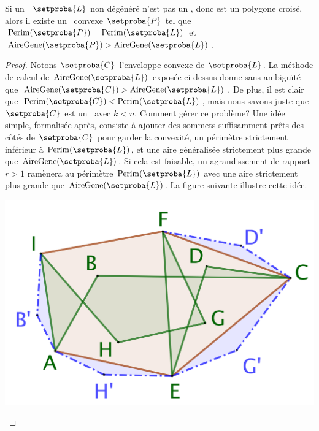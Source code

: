 

\begin{fact} \label{no-cross-max}
    Si un \ncycle\ $\setproba{L}$ non dégénéré n'est pas un \ngone, donc est un polygone croisé, alors il existe un \ngone\ convexe $\setproba{P}$ tel que
	$\perim{\setproba{P}} = \perim{\setproba{L}}$
	et
	$\garea{\setproba{P}} > \garea{\setproba{L}}$.
\end{fact}


\begin{proof}
	Notons $\setproba{C}$ l'enveloppe convexe de $\setproba{L}$. La méthode de calcul de $\garea{\setproba{L}}$ exposée ci-dessus donne sans ambiguïté que $\garea{\setproba{C}} > \garea{\setproba{L}}$. De plus, il est clair que $\perim{\setproba{C}} < \perim{\setproba{L}}$, mais nous savons juste que $\setproba{C}$ est un \kgone\ avec $k < n$. 
	Comment gérer ce problème?
	Une idée simple, formalisée après, consiste à ajouter des sommets suffisamment prêts des côtés de $\setproba{C}$ pour garder la convexité, un périmètre strictement inférieur à $\perim{\setproba{L}}$, et une aire généralisée strictement plus grande que $\garea{\setproba{L}}$. Si cela est faisable, un agrandissement de rapport $r > 1$ ramènera au périmètre $\perim{\setproba{L}}$ avec une aire strictement plus grande que $\garea{\setproba{L}}$.
	La figure suivante illustre cette idée.

	\begin{center}
		\includegraphics[scale=.4]{content/polygon/at-least-one/convex-hull-distortion.png}
	\end{center}



\end{proof}
